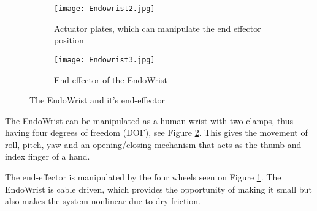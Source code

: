 \begin{figure}
  \centering
  \begin{subfigure}{.22\textwidth}
    \centering
    \texttt{[image: Endowrist2.jpg]}
    \caption{Actuator plates, which can manipulate the end effector position}
    \label{fig:Endo_plates}
  \end{subfigure}
  \begin{subfigure}{.22\textwidth}
    \centering
    \texttt{[image: Endowrist3.jpg]}
    \caption{End-effector of the EndoWrist\newline}
    \label{fig:Endo_end}
  \end{subfigure}
\caption{The EndoWrist and it's end-effector}
\label{fig:endowrits_set}
\end{figure}


The EndoWrist can be manipulated as a human wrist with two clamps, thus having four degrees of freedom (DOF), see Figure \ref{fig:Endo_end}. This gives the movement of roll, pitch, yaw and an opening/closing mechanism that acts as the thumb and index finger of a hand.


The end-effector is manipulated by the four wheels seen on Figure \ref{fig:Endo_plates}. The EndoWrist is cable driven, which provides the opportunity of making it small but also makes the system nonlinear due to dry friction.





